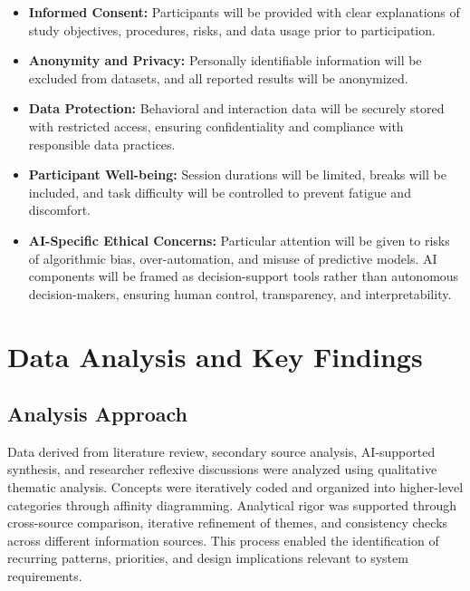 \documentclass[sigconf]{acmart}
\begin{document}
\begin{itemize}
  \item \textbf{Informed Consent:} Participants will be provided with clear explanations of study objectives, procedures, risks, and data usage prior to participation.
  
  \item \textbf{Anonymity and Privacy:} Personally identifiable information will be excluded from datasets, and all reported results will be anonymized.
  
  \item \textbf{Data Protection:} Behavioral and interaction data will be securely stored with restricted access, ensuring confidentiality and compliance with responsible data practices.
  
  \item \textbf{Participant Well-being:} Session durations will be limited, breaks will be included, and task difficulty will be controlled to prevent fatigue and discomfort.
  
  \item \textbf{AI-Specific Ethical Concerns:} Particular attention will be given to risks of algorithmic bias, over-automation, and misuse of predictive models. AI components will be framed as decision-support tools rather than autonomous decision-makers, ensuring human control, transparency, and interpretability.
\end{itemize}

\section{Data Analysis and Key Findings}

\subsection{Analysis Approach}

Data derived from literature review, secondary source analysis, AI-supported synthesis, and researcher reflexive discussions were analyzed using qualitative thematic analysis. Concepts were iteratively coded and organized into higher-level categories through affinity diagramming. Analytical rigor was supported through cross-source comparison, iterative refinement of themes, and consistency checks across different information sources. This process enabled the identification of recurring patterns, priorities, and design implications relevant to system requirements.
\end{document}
